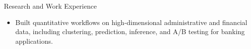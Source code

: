 \documentclass{resume} %
\begin{document}
\begin{rSection}{Research and Work Experience}
\begin{itemize}
    \item Built quantitative workflows on high-dimensional administrative and financial data, including clustering, prediction, inference, and A/B testing for banking applications.
\end{itemize}

%


\end{rSection}
\end{document}
